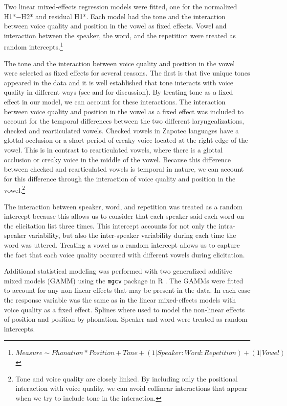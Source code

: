 Two linear mixed-effects regression models were fitted, one for the normalized H1*$-$H2* and residual H1*. Each model had the tone and the interaction between voice quality and position in the vowel as fixed effects. Vowel and interaction between the speaker, the word, and the repetition were treated as random intercepts.\footnote{ $Measure \sim  Phonation*Position + Tone + (1|Speaker:Word:Repetition) + (1|Vowel)$}

The tone and the interaction between voice quality and position in the vowel were selected as fixed effects for several reasons. The first is that five unique tones appeared in the data and it is well established that tone interacts with voice quality in different ways (see \cite{espositoCrossLinguisticPatterns2020} and \cite{garellekPhoneticsVoice2019} for discussion). By treating tone as a fixed effect in our model, we can account for these interactions. The interaction between voice quality and position in the vowel as a fixed effect was included to account for the temporal differences between the two different laryngealizations, checked and rearticulated vowels. Checked vowels in Zapotec languages have a glottal occlusion or a short period of creaky voice located at the right edge of the vowel. This is in contrast to rearticulated vowels, where there is a glottal occlusion or creaky voice in the middle of the vowel. Because this difference between checked and rearticulated vowels is temporal in nature, we can account for this difference through the interaction of voice quality and position in the vowel.\footnote{Tone and voice quality are closely linked. By including only the positional interaction with voice quality, we can avoid collinear interactions that appear when we try to include tone in the interaction.}

The interaction between speaker, word, and repetition was treated as a random intercept because this allows us to consider that each speaker said each word on the elicitation list three times. This intercept accounts for not only the intra-speaker variability, but also the inter-speaker variability during each time the word was uttered. Treating a vowel as a random intercept allows us to capture the fact that each voice quality occurred with different vowels during elicitation.

Additional statistical modeling was performed with two generalized additive mixed models (GAMM) using the \texttt{mgcv} package in R \citep{woodGeneralizedAdditiveModels2017}. The GAMMs were fitted to account for any non-linear effects that may be present in the data. In each case the response variable was the same as in the linear mixed-effects models with voice quality as a fixed effect. Splines where used to model the non-linear effects of position and position by phonation. Speaker and word were treated as random intercepts.

